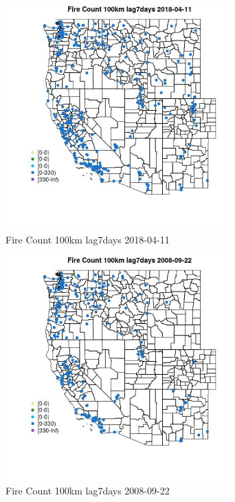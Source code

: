 \begin{figure} 
\centering  
\includegraphics[width=0.77\textwidth]{Code_Outputs/Report_ML_input_PM25_Step4_part_e_de_duplicated_aves_compiled_2019-05-18wNAs_MapObsFire_Count_100km_lag7days2018-04-11.jpg} 
\caption{\label{fig:Report_ML_input_PM25_Step4_part_e_de_duplicated_aves_compiled_2019-05-18wNAsMapObsFire_Count_100km_lag7days2018-04-11}Fire Count 100km lag7days 2018-04-11} 
\end{figure} 
 

\begin{figure} 
\centering  
\includegraphics[width=0.77\textwidth]{Code_Outputs/Report_ML_input_PM25_Step4_part_e_de_duplicated_aves_compiled_2019-05-18wNAs_MapObsFire_Count_100km_lag7days2008-09-22.jpg} 
\caption{\label{fig:Report_ML_input_PM25_Step4_part_e_de_duplicated_aves_compiled_2019-05-18wNAsMapObsFire_Count_100km_lag7days2008-09-22}Fire Count 100km lag7days 2008-09-22} 
\end{figure} 
 

